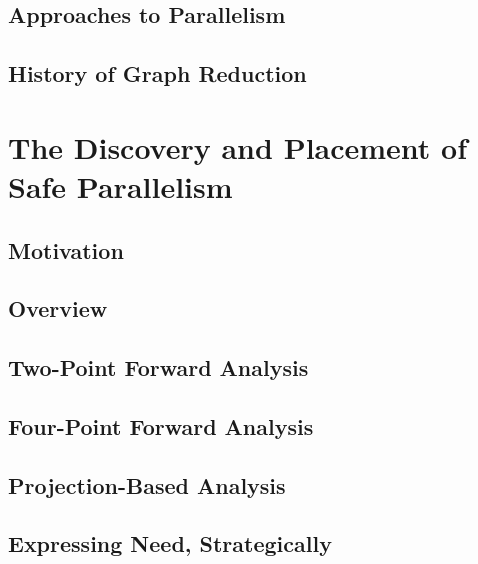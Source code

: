 \documentclass[justified, twoside, a4paper, symmetric]{tufte-book}
\begin{document}
    \section{Approaches to Parallelism}
    \label{sec:Approaches}
    
    
    \section{History of Graph Reduction}
    

\chapter{The Discovery and Placement of Safe Parallelism}
\label{chap:discovery}

    

    \section{Motivation}
    

    \section{Overview}
    

    \section{Two-Point Forward Analysis}
    \label{sec:twoPoint}

    \section{Four-Point Forward Analysis}
    \label{sec:fourPoint}

    \section{Projection-Based Analysis}
    \label{sec:projections}
    


    \section{Expressing Need, Strategically}
    \label{sec:derivations}
    
    
\end{document}
